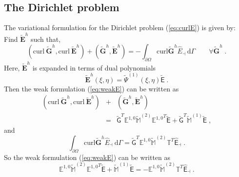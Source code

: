 \documentclass[graybox]{svmult}
\begin{document}
\subsection{The Dirichlet problem}
The variational formulation for the Dirichlet problem (\ref{eq:curlE}) is given by: Find $\widetilde{\bm{E}}^h$ such that,
\begin{equation}
(\mbox{curl}\ \widetilde{\bm{G}}^h, \mbox{curl}\ \widetilde{\bm{E}}^h) + (\widetilde{\bm{G}}^h,\widetilde{\bm{E}}^h) = -\int _{\partial \Omega} \mbox{curl} \widetilde{\bm{G}}^h \hat{E}_{\dashv}\ \mathrm{d}\Gamma  \quad \quad \forall \widetilde{\bm{G}}^h \;.
\label{eq:weakE}
\end{equation}
Here, $\widetilde{\bm{E}}^h$ is expanded in terms of dual polynomials
\begin{equation}
\widetilde{\bm{E}}^h (\xi, \eta) =  \widetilde{\Psi}^{(1)}(\xi, \eta)  \widetilde{\mathsf{E}} \;.
\end{equation}
Then the weak formulation (\ref{eq:weakE}) can be written as
\begin{eqnarray}
(\mbox{curl}\ \widetilde{\bm{G}}^h, \mbox{curl}\ \widetilde{\bm{E}}^h) & + & (\widetilde{\bm{G}}^h,\widetilde{\bm{E}}^h) \nonumber \\
  & = & \widetilde{\mathsf{G}}^T {\mathbb{E}^{1,0}} \widetilde{\mathbb{M}}^{(2)} {\mathbb{E}^{1,0}}^T \widetilde{\mathsf{E}} + \widetilde{\mathsf{G}} ^T\widetilde{\mathbb{M}}^{(1)} \widetilde{\mathsf{E}} \;,
  \label{eq:GE_Hcurl_inner}
\end{eqnarray}
and
\begin{equation}
\int _{\partial \Omega} \mbox{curl} \widetilde{\bm{G}}^h \hat{E}_{\dashv}\ \mathrm{d}\Gamma  = \widetilde{\mathsf{G}}^T \mathbb{E}^{1,0} \widetilde{\mathbb{M}}^{(2)} \mathbb{T}^T \hat{\mathsf{E}}_{\dashv} \;.
\end{equation}
So the weak formulation (\ref{eq:weakE}) can be written as
\begin{equation}
{\mathbb{E}^{1,0}} \widetilde{\mathbb{M}}^{(2)} {\mathbb{E}^{1,0}}^T \widetilde{\mathsf{E}} + \widetilde{\mathbb{M}}^{(1)} \widetilde{\mathsf{E}} = - \mathbb{E}^{1,0} \widetilde{\mathbb{M}}^{(2)} \mathbb{T}^T \hat{\mathsf{E}}_{\dashv}  \;.
\label{eq:discrete_crulE}
\end{equation}
\end{document}
